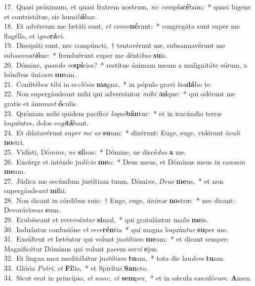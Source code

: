 {17.~}Quasi próximum, et quasi fratrem nostrum, \textit{sic} \textit{com}\textit{pla}\textbf{cé}bam:~* quasi lugens et contristátus, sic humi\textit{li}\textbf{á}bar.\\
{18.~}Et advérsum me lætáti sunt, \textit{et} \textit{con}\textit{ve}\textbf{né}runt:~* congregáta sunt super me flagélla, et i\textit{gno}\textbf{rá}vi.\\
{19.~}Dissipáti sunt, nec compúncti,~† tentavérunt me, subsannavérunt me sub\textit{san}\textit{na}\textit{ti}\textbf{ó}ne:~* frenduérunt super me dénti\textit{bus} \textbf{su}is.\\
{20.~}Dómine, \textit{quan}\textit{do} \textit{re}\textbf{spí}cies?~* restítue ánimam meam a malignitáte eórum, a leónibus úni\textit{cam} \textbf{me}am.\\
{21.~}Confitébor tibi in ec\textit{clé}\textit{si}\textit{a} \textbf{ma}gna,~* in pópulo gravi \textit{lau}\textbf{dá}bo te.\\
{22.~}Non supergáudeant mihi qui adversántur \textit{mi}\textit{hi} \textit{i}\textbf{ní}que:~* qui odérunt me gratis et ánnu\textit{unt} \textbf{ó}culis.\\
{23.~}Quóniam mihi quidem pacífi\textit{ce} \textit{lo}\textit{que}\textbf{bán}tur:~* et in iracúndia terræ loquéntes, dolos co\textit{gi}\textbf{tá}bant.\\
{24.~}Et dilatavérunt su\textit{per} \textit{me} \textit{os} \textbf{su}um:~* dixérunt: Euge, euge, vidérunt ócu\textit{li} \textbf{no}stri.\\
{25.~}Vidísti, Dó\textit{mi}\textit{ne}, \textit{ne} \textbf{sí}leas:~* Dómine, ne discé\textit{das} \textbf{a} me.\\
{26.~}Exsúrge et inténde ju\textit{dí}\textit{ci}\textit{o} \textbf{me}o:~* Deus meus, et Dóminus meus in cau\textit{sam} \textbf{me}am.\\
{27.~}Júdica me secúndum justítiam tuam, Dómi\textit{ne}, \textit{De}\textit{us} \textbf{me}us,~* et non supergáude\textit{ant} \textbf{mi}hi.\\
{28.~}Non dicant in córdibus suis:~† Euge, euge, \textit{á}\textit{ni}\textit{mæ} \textbf{no}stræ:~* nec dicant: Devorávi\textit{mus} \textbf{e}um.\\
{29.~}Erubéscant et reve\textit{re}\textit{án}\textit{tur} \textbf{si}mul,~* qui gratulántur ma\textit{lis} \textbf{me}is.\\
{30.~}Induántur confusióne \textit{et} \textit{re}\textit{ve}\textbf{rén}tia~* qui magna loquún\textit{tur} \textbf{su}per me.\\
{31.~}Exsúltent et læténtur qui volunt ju\textit{stí}\textit{ti}\textit{am} \textbf{me}am:~* et dicant semper: Magnificétur Dóminus qui volunt pacem ser\textit{vi} \textbf{e}jus.\\
{32.~}Et lingua mea meditábitur ju\textit{stí}\textit{ti}\textit{am} \textbf{tu}am,~* tota die lau\textit{dem} \textbf{tu}am.\\
{33.~}Glória \textit{Pa}\textit{tri}, \textit{et} \textbf{Fí}lio,~* et Spirítu\textit{i} \textbf{San}cto.\\
{34.~}Sicut erat in princípio, \textit{et} \textit{nunc}, \textit{et} \textbf{sem}per,~* et in sǽcula sæculó\textit{rum}. \textbf{A}men.\\

